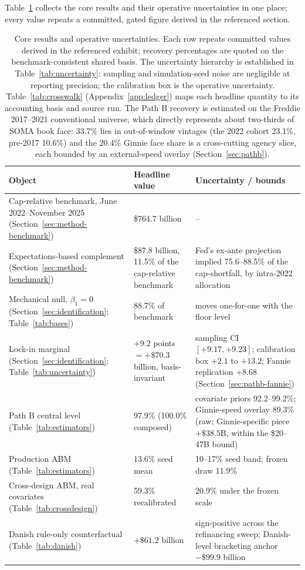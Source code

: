 \documentclass[12pt]{article}
\begin{document}
Table~\ref{tab:headline} collects the core results and their operative uncertainties in one place; every value repeats a committed, gated figure derived in the referenced section.

\begin{table}[H]
\centering
\caption{Core results and operative uncertainties. Each row repeats committed values derived in the referenced exhibit; recovery percentages are quoted on the benchmark-consistent shared basis. The uncertainty hierarchy is established in Table~\ref{tab:uncertainty}: sampling and simulation-seed noise are negligible at reporting precision; the calibration box is the operative uncertainty. Table~\ref{tab:crosswalk} (Appendix~\ref{app:ledger}) maps each headline quantity to its accounting basis and source run. The Path B recovery is estimated on the Freddie 2017--2021 conventional universe, which directly represents about two-thirds of SOMA book face: 33.7\% lies in out-of-window vintages (the 2022 cohort 23.1\%, pre-2017 10.6\%) and the 20.4\% Ginnie face share is a cross-cutting agency slice, each bounded by an external-speed overlay (Section~\ref{sec:pathb}).}
\label{tab:headline}
\footnotesize
\begin{threeparttable}
\begin{tabular}{@{}p{4.6cm}p{4.6cm}p{5.3cm}@{}}
\toprule
Object & Headline value & Uncertainty / bounds \\
\midrule
Cap-relative benchmark, June 2022--November 2025 (Section~\ref{sec:method-benchmark}) & \$764.7 billion & -- \\
Expectations-based complement (Section~\ref{sec:method-benchmark}) & \$87.8 billion, 11.5\% of the cap-relative benchmark & Fed's ex-ante projection implied 75.6--88.5\% of the cap-shortfall, by intra-2022 allocation \\
Mechanical null, $\beta_1 = 0$ (Section~\ref{sec:identification}; Table~\ref{tab:bases}) & 88.7\% of benchmark & moves one-for-one with the floor level \\
Lock-in marginal (Section~\ref{sec:identification}; Table~\ref{tab:uncertainty}) & $+9.2$ points $= +\$70.3$ billion, basis-invariant & sampling CI $[+9.17, +9.23]$; calibration box $+2.1$ to $+13.2$; Fannie replication $+8.68$ (Section~\ref{sec:pathb-fannie}) \\
Path B central level (Table~\ref{tab:estimators}) & 97.9\% (100.0\% composed) & covariate priors 92.2--99.2\%; Ginnie-speed overlay 89.3\% (raw; Ginnie-specific piece $+\$38.5$B, within the \$20--47B bound) \\
Production ABM (Table~\ref{tab:estimators}) & 13.6\% seed mean & 10--17\% seed band; frozen draw 11.9\% \\
Cross-design ABM, real covariates (Table~\ref{tab:crossdesign}) & 59.3\% recalibrated & 20.9\% under the frozen scale \\
Danish rule-only counterfactual (Table~\ref{tab:danish}) & $+\$61.2$ billion & sign-positive across the refinancing sweep; Danish-level bracketing anchor $-\$99.9$ billion \\
\bottomrule
\end{tabular}
\end{threeparttable}
\end{table}
\end{document}
